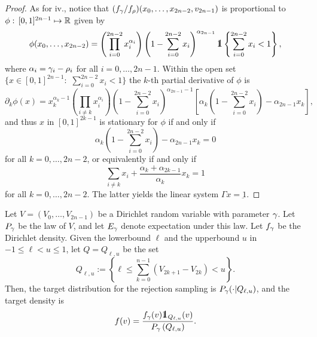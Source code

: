 \documentclass[10pt]{article}
\begin{document}
\begin{proof}
As for iv., notice that $(\dirichletDensity[\dirparam]/\dirichletDensity[\rho]) (x_0,\dots,x_{2n-2},v_{2n-1})$ is proportional to $\phi:\,  [0,1]^{2n-1} \mapsto \R$ given by 
\begin{equation*}
 \phi(x_0,\dots,x_{2n-2}) = 
 \left( \prod_{i=0}^{2n-2} x_{i}^{\alpha_i}\right)
 \left( 1-\sum_{i=0}^{2n-2} x_i \right)^{\alpha_{2n-1}}
 \one\left\lbrace \sum_{i=0}^{2n-2} x_i < 1 \right\rbrace,
\end{equation*}
where $\alpha_i = \dirparam_i  - \rho_i$ for all $i=0,\dots,2n-1$. Within the open set $\lbrace x \in [0,1]^{2n-1}: \, \, \sum_{i=0}^{2n-2} x_i < 1 \rbrace$ the $k$-th partial derivative of $\phi$ is 
\begin{equation*}
 \partial_k \phi(x) = 
 x_{k}^{\alpha_k -1 } 
 \left( \prod_{i\neq k } x_{i}^{\alpha_i}\right)
 \left( 1-\sum_{i=0}^{2n-2} x_i \right)^{\alpha_{2n-1}-1}
 \left[
 \alpha_k \left( 1-\sum_{i=0}^{2n-2} x_i \right) - \alpha_{2n-1} x_k
 \right],
\end{equation*}
and thus $x$ in $[0,1]^{2k-1}$ is stationary for $\phi$ if and only if 
\begin{equation*}
 \alpha_k \left( 1-\sum_{i=0}^{2n-2} x_i \right) - \alpha_{2n-1} x_k = 0
\end{equation*}
for all $k=0,\dots,2n-2$, or equivalently if and only if  
\begin{equation*}
 \sum_{i\neq k} x_i + \frac{\alpha_k + \alpha_{2k-1}}{\alpha_k}x_k = 1
\end{equation*}
for all $k=0,\dots,2n-2$. The latter yields the linear system $\Gamma x = \underbar{1}$. 
\end{proof}



Let $V=(V_{0}, \dots,V_{2n-1})$ be a Dirichlet random variable with parameter $\dirparam$. Let $\dirichletLaw$ be the law of $V$, and let $\Expectation_{\dirparam}$ denote expectation under this law. Let $\dirichletDensity$ be the Dirichlet density.  Given the lowerbound $\ell$ and the upperbound $u$ in $-1\leq \ell < u \leq 1$, let $Q=Q_{\ell, u}$ be the set 
\begin{equation}\label{eq.volimb_constraint}
 Q_{\ell,u}:= \left\lbrace
 \ell \leq \sum_{k=0}^{n-1} \left( V_{2k+1} - V_{2k} \right)
 < u
 \right\rbrace. 
\end{equation}
Then, the target distribution for the rejection sampling is $\dirichletLaw(\cdot \vert Q_{\ell,u})$, and the target density is 
\begin{equation}\label{eq.target_density}
 \targetDensity(v) = 
 \frac{\dirichletDensity(v)\one _{Q_{\ell,u}} (v)}{\dirichletLaw\left(Q_{\ell,u}\right)}. 
\end{equation}
\end{document}
